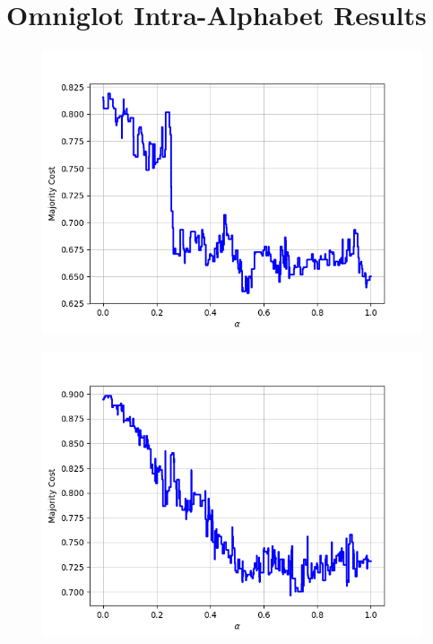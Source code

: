\chapter{Omniglot Intra-Alphabet Results}
\label{app:omniglot}

\begin{figure}[h]
\centering
\begin{minipage}{.19\textwidth}
  \centering
  {\includegraphics[width=\linewidth]{plots/omniglot-intra-ac/Alphabet_of_the_Magi}}
\end{minipage}
\begin{minipage}{.19\textwidth}
  \centering
  {\includegraphics[width=\linewidth]{plots/omniglot-intra-ac/Anglo-Saxon_Futhorc}}

\end{minipage}
\end{figure}
